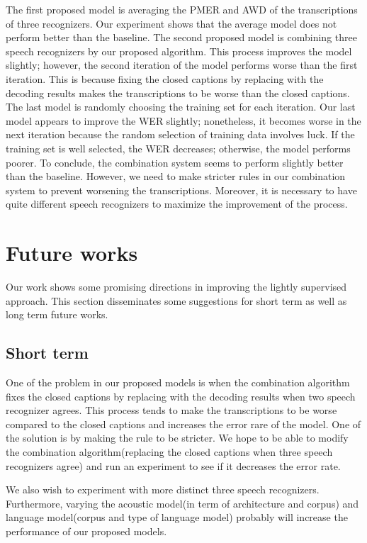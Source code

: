 The first proposed model is averaging the PMER and AWD of the transcriptions of three recognizers. Our experiment shows that the average model does not perform better than the baseline. The second proposed model is combining  three speech recognizers by our proposed algorithm. This process improves the model slightly; however, the second iteration of the model performs worse than the first iteration. This is because fixing the closed captions by replacing with the decoding results makes the transcriptions to be worse than the closed captions. The last model is randomly choosing the training set for each iteration. Our last model appears to improve the WER slightly; nonetheless, it becomes worse in the next iteration because the random selection of training data involves luck. If the training set is well selected, the WER decreases; otherwise, the model performs poorer. To conclude, the combination system seems to perform slightly better than the baseline. However, we need to make stricter rules in our combination system to prevent worsening the transcriptions. Moreover, it is necessary to have quite different speech recognizers to maximize the improvement of the process.



\section{Future works}
Our work shows some promising directions in improving the lightly supervised approach. This section disseminates some suggestions for short term as well as long term future works.

\subsection{Short term}
One of the problem in our proposed models is when the combination algorithm fixes the closed captions by replacing with the decoding results when two speech recognizer agrees. This process tends to make the transcriptions to be worse compared to the closed captions and increases the error rare of the model. One of the solution is by making the rule to be stricter. We hope to be able to modify the combination algorithm(replacing the closed captions when three speech recognizers agree) and run an experiment to see if it decreases the error rate.

We also wish to experiment with more distinct three speech recognizers. Furthermore, varying the acoustic model(in term of architecture and corpus) and language model(corpus and type of language model) probably will increase the performance of our proposed models. 


